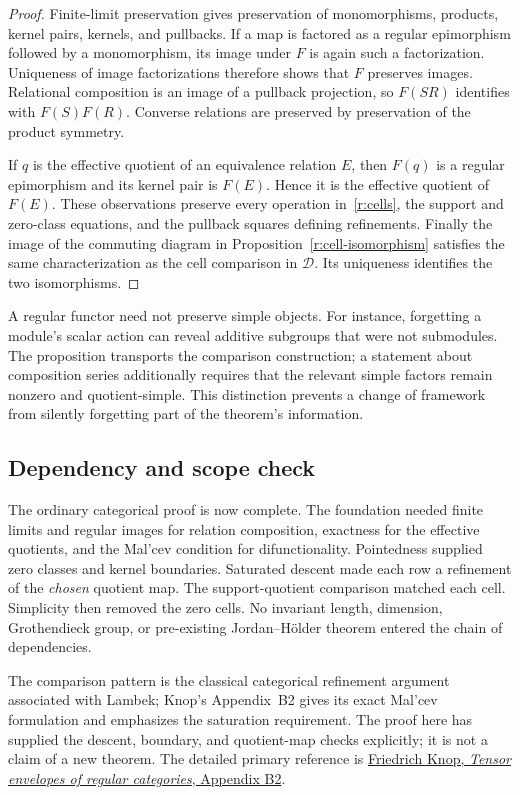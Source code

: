 \begin{proof}
Finite-limit preservation gives preservation of monomorphisms, products,
kernel pairs, kernels, and pullbacks.  If a map is factored as a regular
epimorphism followed by a monomorphism, its image under $F$ is again
such a factorization.  Uniqueness of image factorizations therefore shows
that $F$ preserves images.  Relational composition is an image of a
pullback projection, so $F(SR)$ identifies with $F(S)F(R)$.  Converse
relations are preserved by preservation of the product symmetry.

If $q$ is the effective quotient of an equivalence relation $E$, then
$F(q)$ is a regular epimorphism and its kernel pair is $F(E)$.  Hence it
is the effective quotient of $F(E)$.  These observations preserve every
operation in~\eqref{r:cells}, the support and zero-class equations, and
the pullback squares defining refinements.  Finally the image of the
commuting diagram in Proposition~\ref{r:cell-isomorphism} satisfies the
same characterization as the cell comparison in $\mathcal D$.  Its
uniqueness identifies the two isomorphisms.
\end{proof}

A regular functor need not preserve simple objects.  For instance,
forgetting a module's scalar action can reveal additive subgroups that
were not submodules.  The proposition transports the comparison
construction; a statement about composition series additionally requires
that the relevant simple factors remain nonzero and quotient-simple.
This distinction prevents a change of framework from silently forgetting
part of the theorem's information.

\subsection{Dependency and scope check}

The ordinary categorical proof is now complete.  The foundation needed
finite limits and regular images for relation composition, exactness for
the effective quotients, and the Mal'cev condition for difunctionality.
Pointedness supplied zero classes and kernel boundaries.  Saturated
descent made each row a refinement of the \emph{chosen} quotient map.
The support-quotient comparison matched each cell.  Simplicity then
removed the zero cells.  No invariant length, dimension, Grothendieck
group, or pre-existing Jordan--H\"older theorem entered the chain of
dependencies.

The comparison pattern is the classical categorical refinement argument
associated with Lambek; Knop's Appendix~B2 gives its exact Mal'cev
formulation and emphasizes the saturation requirement.  The proof here
has supplied the descent, boundary, and quotient-map checks explicitly;
it is not a claim of a new theorem.  The detailed primary reference is
\href{https://arxiv.org/pdf/math/0610552}{Friedrich Knop, \emph{Tensor
envelopes of regular categories}, Appendix B2}.

